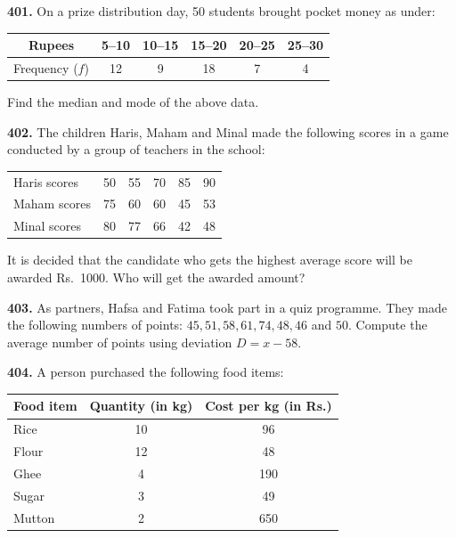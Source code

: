 \documentclass[11pt]{article}
\begin{document}
\bigskip
\noindent\textbf{401.} On a prize distribution day, 50 students brought pocket money as under:

\begin{center}
\begin{tabular}{|c|c|c|c|c|c|}
\hline
Rupees & 5--10 & 10--15 & 15--20 & 20--25 & 25--30 \\
\hline
Frequency ($f$) & 12 & 9 & 18 & 7 & 4 \\
\hline
\end{tabular}
\end{center}

Find the median and mode of the above data.

\bigskip
\noindent\textbf{402.} The children Haris, Maham and Minal made the following scores in a game conducted by a group of teachers in the school:

\begin{center}
\begin{tabular}{|l|c|c|c|c|c|}
\hline
Haris scores & 50 & 55 & 70 & 85 & 90 \\
Maham scores & 75 & 60 & 60 & 45 & 53 \\
Minal scores & 80 & 77 & 66 & 42 & 48 \\
\hline
\end{tabular}
\end{center}

It is decided that the candidate who gets the highest average score will be awarded Rs.~1000. Who will get the awarded amount?

\bigskip
\noindent\textbf{403.} As partners, Hafsa and Fatima took part in a quiz programme. They made the following numbers of points: $45, 51, 58, 61, 74, 48, 46$ and $50$. Compute the average number of points using deviation $D = x - 58$.

\bigskip
\noindent\textbf{404.} A person purchased the following food items:

\begin{center}
\begin{tabular}{|l|c|c|}
\hline
Food item & Quantity (in kg) & Cost per kg (in Rs.) \\
\hline
Rice & 10 & 96 \\
Flour & 12 & 48 \\
Ghee & 4 & 190 \\
Sugar & 3 & 49 \\
Mutton & 2 & 650 \\
\hline
\end{tabular}
\end{center}
\end{document}
